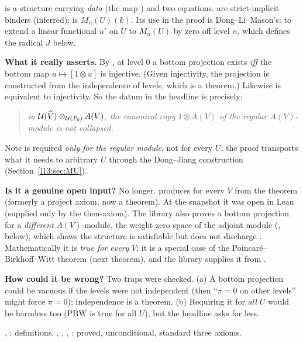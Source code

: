 \begin{dictionary}
\textbf{} is a structure carrying \emph{data} (the map ) and two equations.  are
strict-implicit binders (inferred);  is $M_n(U)(k)$. Its use in the proof is Dong--Li--Mason's: to
extend a linear functional $u'$ on $U$ to $M_n(U)$ by zero off level $n$, which defines the radical $J$ below.

\textbf{What it really asserts.} By , at level $0$ a bottom projection
exists \emph{iff} the bottom map $u\mapsto[1\otimes u]$ is injective. (Given injectivity, the projection is constructed
from the independence of levels, which is a theorem.) Likewise  is equivalent to injectivity.
So the datum  in the headline is precisely:
\begin{quote}
\emph{in $\mathcal{U}(\widehat{V})\otimes_{\mathcal{U}(P_0)}A(V)$, the canonical copy $1\otimes A(V)$ of the regular
$A(V)$-module is not collapsed.}
\end{quote}
Note  is required \emph{only for the regular module}, not for every $U$; the proof transports what it needs to
arbitrary $U$ through the Dong--Jiang construction (Section~\ref{l13:sec:MU}).

\textbf{Is it a genuine open input?} No longer.  produces
 for every $V$ from the theorem  (formerly a project
axiom, now a theorem). At the snapshot it was open in Lean (supplied only by the then-axiom). The library also proves a
bottom projection for a \emph{different} $A(V)$-module, the weight-zero space of the adjoint module
(, below), which shows the structure is satisfiable but does not discharge .
Mathematically it is \emph{true for every} $V$: it is a special case of the Poincar\'e--Birkhoff--Witt theorem (next
theorem), and the library supplies it from .

\textbf{How could it be wrong?} Two traps were checked. (a) A bottom projection could be vacuous if the levels were not
independent (then ``$\pi = 0$ on other levels'' might force $\pi = 0$); independence is a theorem. (b) Requiring it for
\emph{all} $U$ would be harmless too (PBW is true for all $U$), but the headline asks for less.
\end{dictionary}

\begin{status}
, : definitions. , ,
, : proved, unconditional,
standard three axioms.
\end{status}

